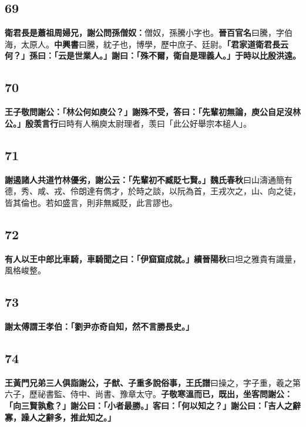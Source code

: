 \subsection*{69}

\textbf{衛君長是蕭祖周婦兄，謝公問孫僧奴：}{\footnotesize 僧奴，孫騰小字也。\textbf{晉百官名}曰騰，字伯海，太原人。\textbf{中興書}曰騰，紞子也，博學，歷中庶子、廷尉。}\textbf{「君家道衛君長云何？」孫曰：「云是世業人。」謝曰：「殊不爾，衛自是理義人。」于時以比殷洪遠。}

\subsection*{70}

\textbf{王子敬問謝公：「林公何如庾公？」謝殊不受，答曰：「先輩初無論，庾公自足沒林公。」}{\footnotesize \textbf{殷羡言行}曰時有人稱庾太尉理者，羡曰「此公好舉宗本槌人」。}

\subsection*{71}

\textbf{謝遏諸人共道竹林優劣，謝公云：「先輩初不臧貶七賢。」}{\footnotesize \textbf{魏氏春秋}曰山濤通簡有德，秀、咸、戎、伶朗達有儁才，於時之談，以阮為首，王戎次之，山、向之徒，皆其倫也。若如盛言，則非無臧貶，此言謬也。}

\subsection*{72}

\textbf{有人以王中郎比車騎，車騎聞之曰：「伊窟窟成就。」}{\footnotesize \textbf{續晉陽秋}曰坦之雅貴有識量，風格峻整。}

\subsection*{73}

\textbf{謝太傅謂王孝伯：「劉尹亦奇自知，然不言勝長史。」}

\subsection*{74}

\textbf{王黃門兄弟三人俱詣謝公，子猷、子重多說俗事，}{\footnotesize \textbf{王氏譜}曰操之，字子重，羲之第六子，歷祕書監、侍中、尚書、豫章太守。}\textbf{子敬寒溫而已，既出，坐客問謝公：「向三賢孰愈？」謝公曰：「小者最勝。」客曰：「何以知之？」謝公曰：「吉人之辭寡，躁人之辭多，推此知之。」}

